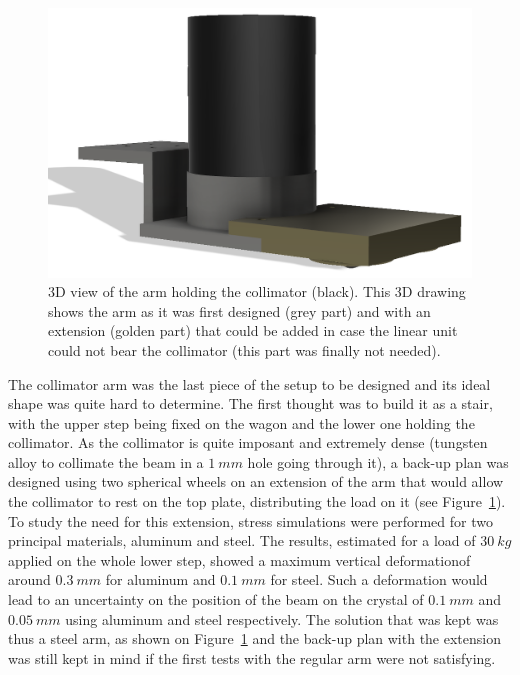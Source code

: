 \documentclass[11pt,a4paper]{article}
\begin{document}
\begin{figure}[!h]
\centering
\includegraphics[scale=0.4]{Arm.png}
\caption{3D view of the arm holding the collimator (black). This 3D drawing shows the arm as it was first designed (grey part) and with an extension (golden part) that could be added in case the linear unit could not bear the collimator (this part was finally not needed).}
\label{arm}
\end{figure}

The collimator arm was the last piece of the setup to be designed and its ideal shape was quite hard to determine. The first thought was to build it as a stair, with the upper step being fixed on the wagon and the lower one holding the collimator. As the collimator is quite imposant and extremely dense (tungsten alloy to collimate the beam in a $1~mm$ hole going through it), a back-up plan was designed using two spherical wheels on an extension of the arm that would allow the collimator to rest on the top plate, distributing the load on it (see Figure~\ref{arm}). To study the need for this extension, stress simulations were performed for two principal materials, aluminum and steel. The results, estimated for a load of $30~kg$ applied on the whole lower step, showed a maximum vertical deformationof around $0.3~mm$ for aluminum and $0.1~mm$ for steel. Such a deformation would lead to an uncertainty on the position of the beam on the crystal of $0.1~mm$ and $0.05~mm$ using aluminum and steel respectively. The solution that was kept was thus a steel arm, as shown on Figure~\ref{arm} and the back-up plan with the extension was still kept in mind if the first tests with the regular arm were not satisfying.

\newpage
\end{document}
